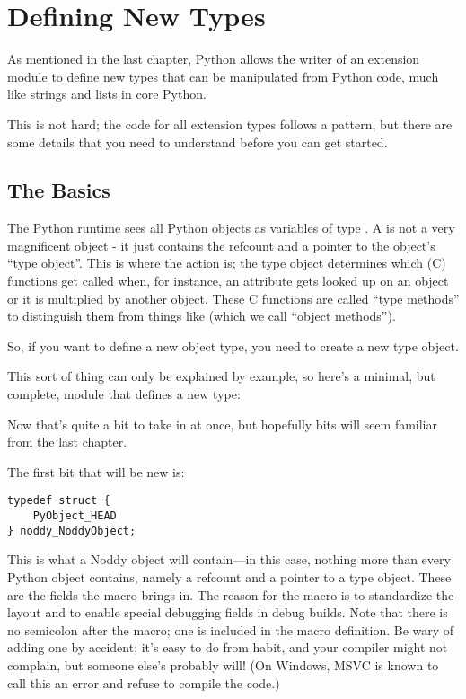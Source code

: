 \chapter{Defining New Types
        \label{defining-new-types}}

As mentioned in the last chapter, Python allows the writer of an
extension module to define new types that can be manipulated from
Python code, much like strings and lists in core Python.

This is not hard; the code for all extension types follows a pattern,
but there are some details that you need to understand before you can
get started.

\section{The Basics
    \label{dnt-basics}}

The Python runtime sees all Python objects as variables of type
.  A  is not a very magnificent
object - it just contains the refcount and a pointer to the object's
``type object''.  This is where the action is; the type object
determines which (C) functions get called when, for instance, an
attribute gets looked up on an object or it is multiplied by another
object.  These C functions are called ``type methods'' to distinguish
them from things like  (which we call ``object
methods'').

So, if you want to define a new object type, you need to create a new
type object.

This sort of thing can only be explained by example, so here's a
minimal, but complete, module that defines a new type:



Now that's quite a bit to take in at once, but hopefully bits will
seem familiar from the last chapter.

The first bit that will be new is:

\begin{verbatim}
typedef struct {
    PyObject_HEAD
} noddy_NoddyObject;
\end{verbatim}

This is what a Noddy object will contain---in this case, nothing more
than every Python object contains, namely a refcount and a pointer to a type
object.  These are the fields the  macro brings
in.  The reason for the macro is to standardize the layout and to
enable special debugging fields in debug builds.  Note that there is
no semicolon after the  macro; one is included in
the macro definition.  Be wary of adding one by accident; it's easy to
do from habit, and your compiler might not complain, but someone
else's probably will!  (On Windows, MSVC is known to call this an
error and refuse to compile the code.)


